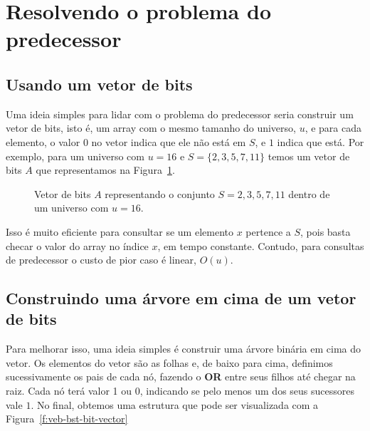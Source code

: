 \section{Resolvendo o problema do predecessor}

\subsection{Usando um vetor de bits}

Uma ideia simples para lidar com o problema do predecessor seria construir um
vetor de bits, isto é, um array com o mesmo tamanho do universo, $u$, e para
cada elemento, o valor $0$ no vetor indica que ele não está em $S$, e $1$ indica
que está. Por exemplo, para um universo com $u=16$ e $S=\{2,3,5,7,11\}$ temos um
vetor de bits $A$ que representamos na Figura~\ref{f:veb-bit-vector}.

\begin{figure}[h]
\centering
{}
\caption{Vetor de bits $A$ representando o conjunto $S={2,3,5,7,11}$ dentro de
um universo com $u=16$. \label{f:veb-bit-vector}}
\end{figure}

Isso é muito eficiente para consultar se um elemento $x$ pertence a $S$, pois
basta checar o valor do array no índice $x$, em tempo constante. Contudo, para
consultas de predecessor o custo de pior caso é linear, $O(u)$.

\subsection{Construindo uma árvore em cima de um vetor de bits}

Para melhorar isso, uma ideia simples é construir uma árvore binária em cima do
vetor. Os elementos do vetor são as folhas e, de baixo para cima, definimos
sucessivamente os pais de cada nó, fazendo o \textbf{OR} entre seus filhos até
chegar na raiz. Cada nó terá valor 1 ou 0, indicando se pelo menos um dos seus
sucessores vale $1$. No final, obtemos uma estrutura que pode ser visualizada
com a Figura~\ref{f:veb-bst-bit-vector}

\enlargethispage{3\baselineskip}

